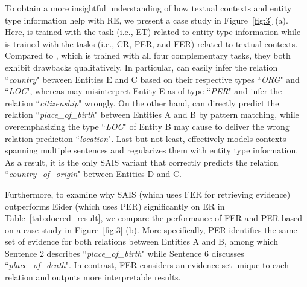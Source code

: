 To obtain a more insightful understanding of how textual contexts and entity type information help with RE, we present a case study in Figure~\ref{fig:3} (a).
Here,  is trained with the task (i.e., ET) related to entity type information while  is trained with the tasks (i.e., CR, PER, and FER) related to textual contexts.
Compared to , which is trained with all four complementary tasks, they both exhibit drawbacks qualitatively.
In particular,  can easily infer the relation ``\textit{country}" between Entities E and C based on their respective types ``\textit{ORG}" and ``\textit{LOC}", whereas  may misinterpret Entity E as of type ``\textit{PER}" and infer the relation ``\textit{citizenship}" wrongly.
On the other hand,  can directly predict the relation ``\textit{place\_of\_birth}" between Entities A and B by pattern matching, while overemphasizing the type ``\textit{LOC}" of Entity B may cause  to deliver the wrong relation prediction ``\textit{location}".
Last but not least,  effectively models contexts spanning multiple sentences and regularizes them with entity type information.
As a result, it is the only SAIS variant that correctly predicts the relation ``\textit{country\_of\_origin}" between Entities D and C.

Furthermore, to examine why SAIS (which uses FER for retrieving evidence) outperforms Eider \cite{xie2021eider} (which uses PER) significantly on ER in Table~\ref{tab:docred_result}, we compare the performance of FER and PER based on a case study in Figure~\ref{fig:3} (b).
More specifically, PER identifies the same set of evidence for both relations between Entities A and B, among which Sentence 2 describes ``\textit{place\_of\_birth}" while Sentence 6 discusses ``\textit{place\_of\_death}".
In contrast, FER considers an evidence set unique to each relation and outputs more interpretable results.